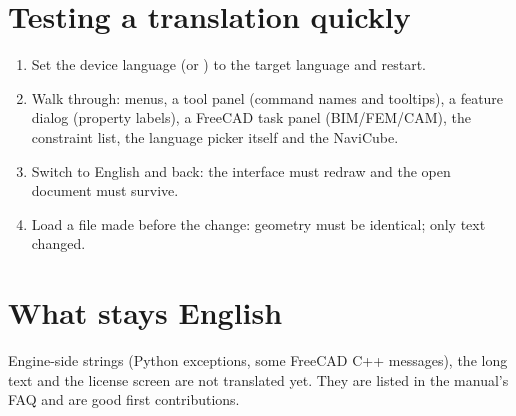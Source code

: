 \section*{Testing a translation quickly}
\begin{enumerate}
  \item Set the device language (or ) to the target language and restart.
  \item Walk through: menus, a tool panel (command names and tooltips), a feature dialog (property labels), a
        FreeCAD task panel (BIM/FEM/CAM), the constraint list, the language picker itself and the NaviCube.
  \item Switch to English and back: the interface must redraw and the open document must survive.
  \item Load a file made before the change: geometry must be identical; only text changed.
\end{enumerate}

\section*{What stays English}
Engine-side strings (Python exceptions, some FreeCAD C++ messages), the long  text and the license
screen are not translated yet. They are listed in the manual's FAQ and are good first contributions.
